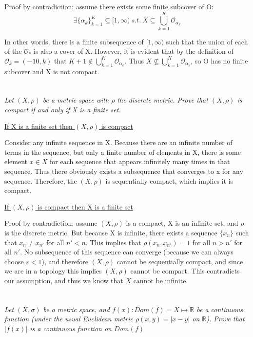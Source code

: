 \documentclass[]{article}
\newcommand{\reals}{\mathbb{R}}
\begin{document}
			Proof by contradiction: assume there exists some finite subcover of O:
			\[\exists \{\alpha_k\}_{k = 1}^K \subseteq [1, \infty)\ s.t.\ X \subseteq \bigcup_{k =1}^K \mathcal{O}_{\alpha_k}\]

			In other words, there is a finite subsequence of $[1, \infty)$ such that the union of each of the $\mathcal{O}$s is also a cover of X. However, it is evident that by the definition of $\mathcal{O}_k = (-10, k)$ that $K+1 \notin \bigcup_{k =1}^K \mathcal{O}_{\alpha_k}$. Thus $X \not \subseteq \bigcup_{k =1}^K \mathcal{O}_{\alpha_k}$, so O has no finite subcover and X is not compact. 

	\section{}
		\textit{Let $(X, \rho)$ be a metric space with $\rho$ the discrete metric. Prove that $(X, \rho)$ is compact if and only if X is a finite set.}

		\underline{If X is a finite set then $(X, \rho)$ is compact} %

		Consider any infinite sequence in X. Because there are an infinite number of terms in the sequence, but only a finite number of elements in X, there is some element $x \in X$ for each sequence that appears infinitely many times in that sequence. Thus there obviously exists a subsequence that converges to x for any sequence. Therefore, the $(X, \rho)$ is sequentially compact, which implies it is compact. 


		\underline{If $(X, \rho)$ is compact then X is a finite set} %

		Proof by contradiction: assume $(X, \rho)$ is a compact, X is an infinite set, and $\rho$ is the discrete metric. But because X is infinite, there exists a sequence $\{x_n\}$ such that $x_n \neq x_{n'}$ for all $n' < n$. This implies that $\rho(x_n, x_{n'}) = 1$ for all $n > n'$ for all $n'$. No subsequence of this sequence can converge (because we can always choose $\varepsilon < 1$), and therefore $(X, \rho)$ cannot be sequentially compact, and since we are in a topology this implies $(X, \rho)$ cannot be compact. This contradicts our assumption, and thus we know that $X$ cannot be infinite. 

	\section{}
		\textit{Let $(X, \sigma)$ be a metric space, and $f(x) : Dom(f) = X \mapsto \reals$ be a continuous function (under the usual Euclidean metric $\rho(x, y) = |x - y| $ on $\reals$). Prove that $|f(x)|$ is a continuous function on $Dom(f)$}
\end{document}
